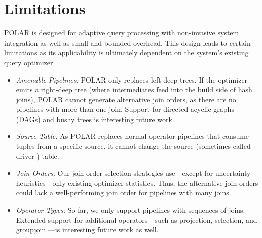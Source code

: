 
\section{Limitations}
\label{sec:limits}
%
POLAR is designed for adaptive query processing with non-invasive system integration as well as small and bounded overhead. This design leads to certain limitations as its applicability is ultimately dependent on the system's existing query optimizer. 
\begin{itemize}
\item \emph{Amenable Pipelines:} POLAR only replaces left-deep-trees. If the optimizer emits a right-deep tree (where intermediates feed into the build side of hash joins), POLAR cannot generate alternative join orders, as there are no pipelines with more than one join. Support for directed acyclic graphs (DAGs) and bushy trees is interesting future work.
\item \emph{Source Table:} As POLAR replaces normal operator pipelines that consume tuples from a specific source, it cannot change the source (sometimes called driver \cite{LiSMBCL07}) table.
\item \emph{Join Orders:} Our join order selection strategies use---except for uncertainty heuristics---only existing optimizer statistics. Thus, the alternative join orders could lack a well-performing join order for pipelines with many joins.
\item \emph{Operator Types:} So far, we only support pipelines with sequences of joins. Extended support for additional operators---such as projection, selection, and groupjoin \cite{MoerkotteN11}---is interesting future work as well.
\end{itemize}
